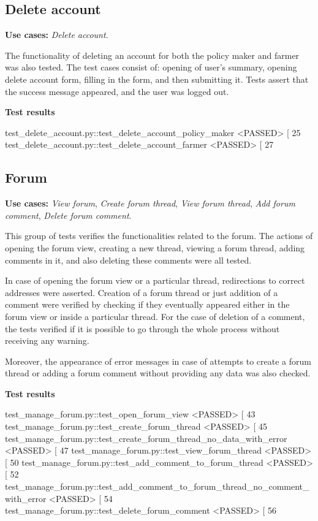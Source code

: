 \subsection{Delete account}

\textbf{Use cases:} \textit{Delete account}.

The functionality of deleting an account for both the policy maker and farmer was also tested. The test cases consist of: opening of user's summary, opening delete account form, filling in the form, and then submitting it. Tests assert that the success message appeared, and the user was logged out.

\textbf{Test results}
\begin{verbnobox}[\footnotesize \vbdelim]
test_delete_account.py::test_delete_account_policy_maker <PASSED>          [ 25%
test_delete_account.py::test_delete_account_farmer <PASSED>                [ 27%
\end{verbnobox}

\subsection{Forum}

\textbf{Use cases:} \textit{View forum}, \textit{Create forum thread}, \textit{View forum thread}, \textit{Add forum comment}, \textit{Delete forum comment}.

This group of tests verifies the functionalities related to the forum. The actions of opening the forum view, creating a new thread, viewing a forum thread, adding comments in it, and also deleting these comments were all tested.

In case of opening the forum view or a particular thread, redirections to correct addresses were asserted. Creation of a forum thread or just addition of a comment were verified by checking if they eventually appeared either in the forum view or inside a particular thread. For the case of deletion of a comment, the tests verified if it is possible to go through the whole process without receiving any warning.

Moreover, the appearance of error messages in case of attempts to create a forum thread or adding a forum comment without providing any data was also checked.

\textbf{Test results}
\begin{verbnobox}[\footnotesize \vbdelim]
test_manage_forum.py::test_open_forum_view <PASSED>                                   [ 43%
test_manage_forum.py::test_create_forum_thread <PASSED>                               [ 45%
test_manage_forum.py::test_create_forum_thread_no_data_with_error <PASSED>            [ 47%
test_manage_forum.py::test_view_forum_thread <PASSED>                                 [ 50%
test_manage_forum.py::test_add_comment_to_forum_thread <PASSED>                       [ 52%
test_manage_forum.py::test_add_comment_to_forum_thread_no_comment_with_error <PASSED> [ 54%
test_manage_forum.py::test_delete_forum_comment <PASSED>                              [ 56%
\end{verbnobox}

